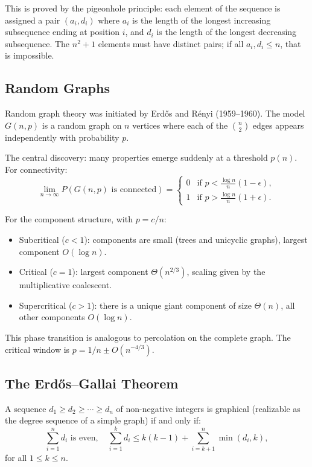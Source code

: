This is proved by the pigeonhole principle: each element of the sequence is assigned a pair $(a_i, d_i)$ where $a_i$ is the length of the longest increasing subsequence ending at position $i$, and $d_i$ is the length of the longest decreasing subsequence. The $n^2+1$ elements must have distinct pairs; if all $a_i, d_i \leq n$, that is impossible.

\subsection{Random Graphs}

Random graph theory was initiated by Erd\H{o}s and R\'{e}nyi (1959--1960). The model $G(n,p)$ is a random graph on $n$ vertices where each of the $\binom{n}{2}$ edges appears independently with probability $p$.

The central discovery: many properties emerge suddenly at a threshold $p(n)$. For connectivity:
\[
\lim_{n \to \infty} P(G(n,p) \text{ is connected}) = 
\begin{cases}
0 & \text{if } p < \frac{\log n}{n} (1-\epsilon), \\
1 & \text{if } p > \frac{\log n}{n} (1+\epsilon).
\end{cases}
\]

For the component structure, with $p = c/n$:
\begin{itemize}
    \item Subcritical ($c < 1$): components are small (trees and unicyclic graphs), largest component $O(\log n)$.
    \item Critical ($c = 1$): largest component $\Theta(n^{2/3})$, scaling given by the multiplicative coalescent.
    \item Supercritical ($c > 1$): there is a unique giant component of size $\Theta(n)$, all other components $O(\log n)$.
\end{itemize}

This phase transition is analogous to percolation on the complete graph. The critical window is $p = 1/n \pm O(n^{-4/3})$.

\subsection{The Erd\H{o}s--Gallai Theorem}

A sequence $d_1 \geq d_2 \geq \cdots \geq d_n$ of non-negative integers is graphical (realizable as the degree sequence of a simple graph) if and only if:
\[
\sum_{i=1}^n d_i \text{ is even}, \quad \sum_{i=1}^k d_i \leq k(k-1) + \sum_{i=k+1}^n \min(d_i, k),
\]
for all $1 \leq k \leq n$.


